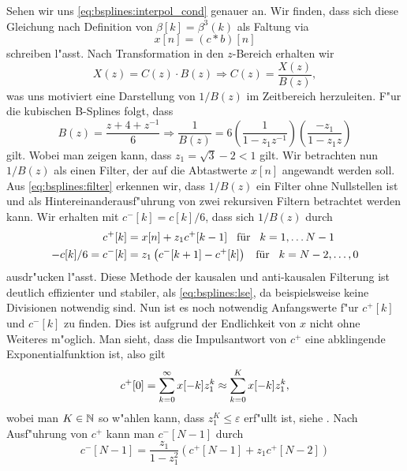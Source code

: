Sehen wir uns \eqref{eq:bsplines:interpol_cond} genauer an. 
Wir finden, dass sich diese Gleichung nach Definition von $\beta[k] = \beta^3(k)$ als Faltung via
\begin{equation}\label{eq:bsplines:conv}
    x[n] = (c \ast b)[n]
\end{equation}
schreiben l"asst. 
Nach Transformation in den $z$-Bereich erhalten wir
\begin{equation}\label{eq:bsplines:ztrafo}
    X(z) = C(z) \cdot B(z) \Rightarrow C(z) = \frac{X(z)}{B(z)},
\end{equation}
was uns motiviert eine Darstellung von $1/B(z)$ im Zeitbereich herzuleiten. 
F"ur die kubischen B-Splines folgt, dass
\begin{equation}\label{eq:bsplines:filter}
    B(z) = \frac{z + 4 + z^{-1}}{6} 
    \Rightarrow \frac{1}{B(z)} 
        = 6 \left(\frac{1}{1 - z_1 z^{-1}}\right) \left(\frac{-z_1}{1 - z_1 z}\right)
\end{equation}
gilt. 
Wobei man zeigen kann, dass $z_1 = \sqrt{3} - 2 < 1$ gilt. 
Wir betrachten nun $1/B(z)$ als einen Filter, der auf die Abtastwerte $x[n]$ angewandt werden soll. 
Aus \eqref{eq:bsplines:filter} erkennen wir, dass $1/B(z)$ ein Filter ohne Nullstellen ist und als Hintereinanderausf"uhrung von zwei rekursiven Filtern betrachtet werden kann. 
Wir erhalten mit $c^{-}[k] = c[k]/6$, dass sich $1/B(z)$ durch
\begin{align}
    c^+[k] &= 
        x[n] + z_1 c^+[k-1] {\hspace{3mm} \text{f\"ur} \hspace{3mm}} k = 1, \dots N-1 \\
    -c[k]/6 = c^-[k] &= 
        z_1\left( c^{-}[k+1] - c^+[k]\right) {\hspace{3mm} \text{f\"ur} \hspace{3mm}} k = N-2, \dots, 0
\end{align}
ausdr"ucken l"asst. 
Diese Methode der kausalen und anti-kausalen Filterung ist deutlich effizienter und stabiler, als \eqref{eq:bsplines:lse}, da beispielsweise keine Divisionen notwendig sind. 
Nun ist es noch notwendig Anfangswerte f"ur $c^+[k]$ und $c^-[k]$ zu finden. 
Dies ist aufgrund der Endlichkeit von $x$ nicht ohne Weiteres m"oglich. 
Man sieht, dass die Impulsantwort von $c^+$ eine abklingende Exponentialfunktion ist, also gilt
\begin{equation}
    c^+[0] = {\sum\limits_{k=0}^{\infty}{x[-k] z_1^k}} \approx {\sum\limits_{k=0}^{K}{x[-k] z_1^k}},
\end{equation}
wobei man $K \in \mathbb{N}$ so w"ahlen kann, dass $z_1^K \leqslant \varepsilon$ erf"ullt ist, siehe .
Nach Ausf"uhrung von $c^+$ kann man $c^-[N-1]$ durch
\begin{equation}
    c^-[N-1] = \frac{z_1}{1 - z_1^2}\left(c^+[N-1] + z_1 c^+[N-2]\right)
\end{equation}
